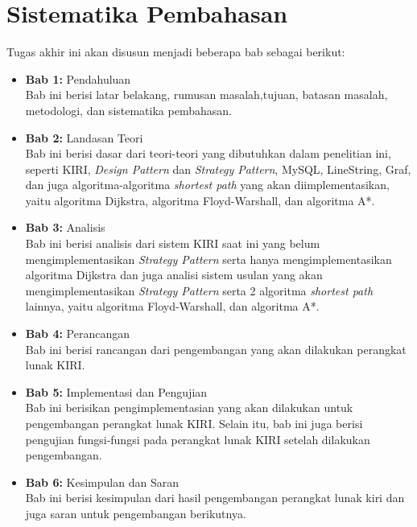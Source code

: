 \section{Sistematika Pembahasan}
\label{sec:sispem}
Tugas akhir ini akan disusun menjadi beberapa bab sebagai berikut:
\begin{itemize}
    \item \textbf{Bab 1:} Pendahuluan
    \\ Bab ini berisi latar belakang, rumusan masalah,tujuan, batasan masalah, metodologi, dan sistematika pembahasan.
    \item \textbf{Bab 2:} Landasan Teori
    \\ Bab ini berisi dasar dari teori-teori yang dibutuhkan dalam penelitian ini, seperti KIRI, \textit{Design Pattern} dan \textit{Strategy Pattern}, MySQL, LineString, Graf, dan juga algoritma-algoritma \textit{shortest path} yang akan diimplementasikan, yaitu algoritma Dijkstra, algoritma Floyd-Warshall, dan algoritma A*.
    \item \textbf{Bab 3:} Analisis
    \\ Bab ini berisi analisis dari sistem KIRI saat ini yang belum mengimplementasikan \textit{Strategy Pattern} serta hanya mengimplementasikan algoritma Dijkstra dan juga analisi sistem usulan yang akan mengimplementasikan \textit{Strategy Pattern} serta 2 algoritma \textit{shortest path} lainnya, yaitu algoritma Floyd-Warshall, dan algoritma A*. 
    \item \textbf{Bab 4:} Perancangan
    \\ Bab ini berisi rancangan dari pengembangan yang akan dilakukan perangkat lunak KIRI.
    \item \textbf{Bab 5:} Implementasi dan Pengujian
    \\ Bab ini berisikan pengimplementasian yang akan dilakukan untuk pengembangan perangkat lunak KIRI. Selain itu, bab ini juga berisi pengujian fungsi-fungsi pada perangkat lunak KIRI setelah dilakukan pengembangan.
    \item \textbf{Bab 6:} Kesimpulan dan Saran
    \\ Bab ini berisi kesimpulan dari hasil pengembangan perangkat lunak kiri dan juga saran untuk pengembangan berikutnya.
        
\end{itemize}
